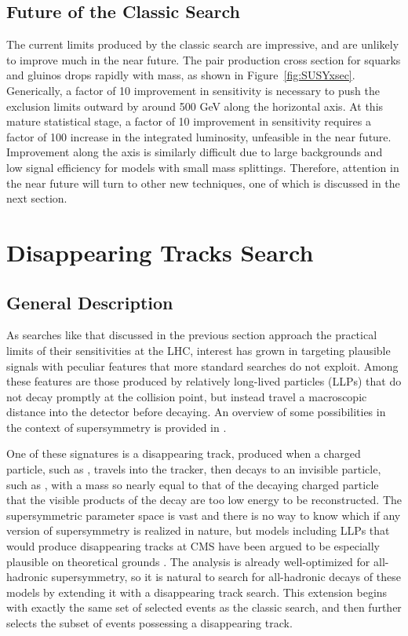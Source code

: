   \subsection{Future of the Classic \mttwo Search} \label{sec:MT2future}

  The current limits produced by the classic \mttwo search are impressive, and are unlikely to improve much in the near future.
  The pair production cross section for squarks and gluinos drops rapidly with mass, as shown in Figure~\ref{fig:SUSYxsec}.
  Generically, a factor of 10 improvement in sensitivity is necessary to push the exclusion limits outward by around 500 GeV along the horizontal axis.
  At this mature statistical stage, a factor of 10 improvement in sensitivity requires a factor of 100 increase in the integrated luminosity, unfeasible in the near future.
  Improvement along the \lsp axis is similarly difficult due to large backgrounds and low signal efficiency for models with small mass splittings.
  Therefore, attention in the near future will turn to other new techniques, one of which is discussed in the next section.

\section{Disappearing Tracks Search} \label{sec:distracks}

  \subsection{General Description} \label{sec:distracksdescription}

  As searches like that discussed in the previous section approach the practical limits of their sensitivities at the LHC, interest has grown in targeting plausible signals with peculiar features that more standard searches do not exploit.
  Among these features are those produced by relatively long-lived particles (LLPs) that do not decay promptly at the collision point, but instead travel a macroscopic distance into the detector before decaying. 
  An overview of some possibilities in the context of supersymmetry is provided in \cite{LLPsAtLHC}.

  One of these signatures is a disappearing track, produced when a charged particle, such as \chargino, travels into the tracker, then decays to an invisible particle, such as \lsp, with a mass so nearly equal to that of the decaying charged particle that the visible products of the decay are too low energy to be reconstructed. 
  The supersymmetric parameter space is vast and there is no way to know which if any version of supersymmetry is realized in nature, but models including LLPs that would produce disappearing tracks at CMS have been argued to be especially plausible on theoretical grounds \cite{distracks1, distracksAMSB, AMSBlifetime}.
  The \mttwo analysis is already well-optimized for all-hadronic supersymmetry, so it is natural to search for all-hadronic decays of these models by extending it with a disappearing track search.
  This extension begins with exactly the same set of selected events as the classic search, and then further selects the subset of events possessing a disappearing track.

